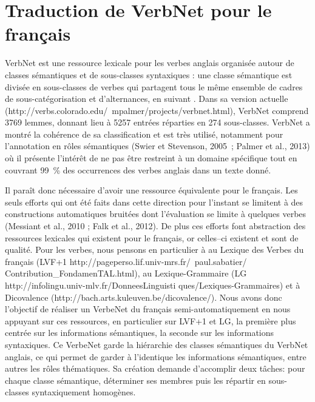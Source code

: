\chapter{Traduction de VerbNet pour le français}
\label{ch:verbnet}


VerbNet est une ressource lexicale pour les verbes anglais organisée autour de classes sémantiques et de sous-classes syntaxiques : une classe sémantique est divisée en sous-classes de verbes qui partagent tous le même ensemble de cadres de sous-catégorisation et d’alternances, en suivant \cite{levin1993english}. Dans sa version actuelle (http://verbs.colorado.edu/~mpalmer/projects/verbnet.html), VerbNet comprend 3769 lemmes, donnant lieu à 5257 entrées réparties en 274 sous-classes. VerbNet a montré la cohérence de sa classification et est très utilisé, notamment pour l'annotation en rôles sémantiques (Swier et Stevenson, 2005 ; Palmer et al., 2013) où il présente l'intérêt de ne pas être restreint à un domaine spécifique tout en couvrant 99~\% des occurrences des verbes anglais dans un texte donné.

Il paraît donc nécessaire d’avoir une ressource équivalente pour le français. Les seuls efforts qui ont été faits dans cette direction pour l’instant se limitent à des constructions automatiques bruitées dont l'évaluation se limite à quelques verbes (Messiant et al., 2010 ; Falk et al., 2012). De plus ces efforts font abstraction des ressources lexicales qui existent pour le français, or celles–ci existent et sont de qualité. Pour les verbes, nous pensons en particulier à au Lexique des Verbes du français (LVF+1 http://pageperso.lif.univ-mrs.fr/~paul.sabatier/ Contribution_FondamenTAL.html), au Lexique-Grammaire (LG http://infolingu.univ-mlv.fr/DonneesLinguisti ques/Lexiques-Grammaires) et à Dicovalence (http://bach.arts.kuleuven.be/dicovalence/). Nous avons donc l’objectif de réaliser un VerbeNet du français semi-automatiquement en nous appuyant sur ces ressources, en particulier sur LVF+1 et LG, la première plus centrée sur les informations sémantiques, la seconde sur les informations syntaxiques. Ce VerbeNet garde la hiérarchie des classes sémantiques du VerbNet anglais, ce qui permet de garder à l'identique les informations sémantiques, entre autres les rôles thématiques. Sa création demande d’accomplir deux tâches: pour chaque classe sémantique, déterminer ses membres puis les répartir en sous-classes syntaxiquement homogènes.

